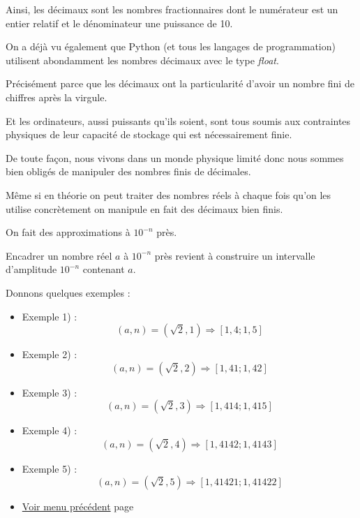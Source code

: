 \documentclass[a4paper,11pt]{book}
\begin{document}
Ainsi, les décimaux sont les nombres fractionnaires dont le numérateur
est un entier relatif et le dénominateur une puissance de 10.


On a déjà vu également que Python (et tous les langages de
programmation) utilisent abondamment les nombres décimaux avec le
type \emph{float}.


Précisément parce que les décimaux ont la particularité d'avoir un
nombre fini de chiffres après la virgule.


Et les ordinateurs, aussi puissants qu'ils soient, sont tous soumis
aux contraintes physiques de leur capacité de stockage qui est
nécessairement finie.



De toute façon, nous vivons dans un monde physique limité donc nous
sommes bien obligés de manipuler des nombres finis de
décimales.



Même si en théorie on peut traiter des nombres réels à chaque fois
qu'on les utilise concrètement on manipule en fait des
décimaux bien finis.


On fait des approximations à \(10^{-n}\) près.


Encadrer un nombre réel \(a\) à \(10^{-n}\) près revient à construire
un intervalle d'amplitude \(10^{-n}\) contenant \(a\).

\clearpage

Donnons quelques exemples :


\begin{itemize}
\item Exemple 1) : \[(a, n) = (\sqrt{2}, 1)\Rightarrow [1,4 ; 1,5]\]
\item Exemple 2) : \[(a, n) = (\sqrt{2}, 2)\Rightarrow [1,41 ; 1,42]\]
\item Exemple 3) : \[(a, n) = (\sqrt{2}, 3)\Rightarrow [1,414 ; 1,415]\]
\item Exemple 4) : \[(a, n) = (\sqrt{2}, 4)\Rightarrow [1,4142 ; 1,4143]\]
\item Exemple 5) : \[(a, n) = (\sqrt{2}, 5)\Rightarrow [1,41421 ; 1,41422]\]
\end{itemize}


\begin{itemize}
\item \hyperref[orgdd2209a]{Voir menu précédent}
page~\pageref{page:content5-menu}
\end{itemize}


\clearpage
\end{document}
